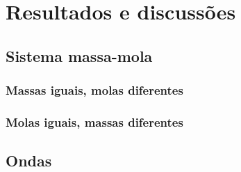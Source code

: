 \section{Resultados e discussões}
\subsection{Sistema massa-mola}
\subsubsection{Massas iguais, molas diferentes}
\subsubsection{Molas iguais, massas diferentes}
            
\subsection{Ondas}

    
